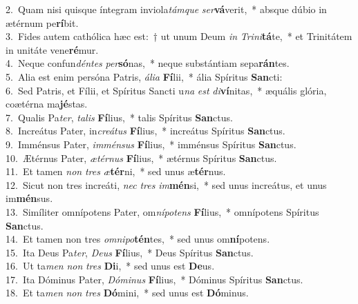 {2.~}Quam nisi quisque íntegram inviola\textit{tám}\textit{que} \textit{ser}\textbf{vá}verit,~* absque dúbio in ætérnum pe\textbf{rí}bit.\\
{3.~}Fides autem cathólica hæc est:~† ut unum Deum \textit{in} \textit{Tri}\textit{ni}\textbf{tá}te,~* et Trinitátem in unitáte vene\textbf{ré}mur.\\
{4.~}Neque confun\textit{dén}\textit{tes} \textit{per}\textbf{só}nas,~* neque substántiam sepa\textbf{rán}tes.\\
{5.~}Alia est enim persóna Patris, \textit{á}\textit{li}\textit{a} \textbf{Fí}lii,~* ália Spíritus \textbf{San}cti:\\
{6.~}Sed Patris, et Fílii, et Spíritus Sancti u\textit{na} \textit{est} \textit{di}\textbf{ví}nitas,~* æquális glória, coætérna ma\textbf{jé}stas.\\
{7.~}Qualis Pa\textit{ter}, \textit{ta}\textit{lis} \textbf{Fí}lius,~* talis Spíritus \textbf{San}ctus.\\
{8.~}Increátus Pater, in\textit{cre}\textit{á}\textit{tus} \textbf{Fí}lius,~* increátus Spíritus \textbf{San}ctus.\\
{9.~}Imménsus Pater, \textit{im}\textit{mén}\textit{sus} \textbf{Fí}lius,~* imménsus Spíritus \textbf{San}ctus.\\
{10.~}Ætérnus Pater, \textit{æ}\textit{tér}\textit{nus} \textbf{Fí}lius,~* ætérnus Spíritus \textbf{San}ctus.\\
{11.~}Et tamen \textit{non} \textit{tres} \textit{æ}\textbf{tér}ni,~* sed unus æ\textbf{tér}nus.\\
{12.~}Sicut non tres increáti, \textit{nec} \textit{tres} \textit{im}\textbf{mén}si,~* sed unus increátus, et unus im\textbf{mén}sus.\\
{13.~}Simíliter omnípotens Pater, om\textit{ní}\textit{po}\textit{tens} \textbf{Fí}lius,~* omnípotens Spíritus \textbf{San}ctus.\\
{14.~}Et tamen non tres \textit{om}\textit{ni}\textit{po}\textbf{tén}tes,~* sed unus om\textbf{ní}potens.\\
{15.~}Ita Deus Pa\textit{ter}, \textit{De}\textit{us} \textbf{Fí}lius,~* Deus Spíritus \textbf{San}ctus.\\
{16.~}Ut ta\textit{men} \textit{non} \textit{tres} \textbf{Di}i,~* sed unus est \textbf{De}us.\\
{17.~}Ita Dóminus Pater, \textit{Dó}\textit{mi}\textit{nus} \textbf{Fí}lius,~* Dóminus Spíritus \textbf{San}ctus.\\
{18.~}Et ta\textit{men} \textit{non} \textit{tres} \textbf{Dó}mini,~* sed unus est \textbf{Dó}minus.\\

